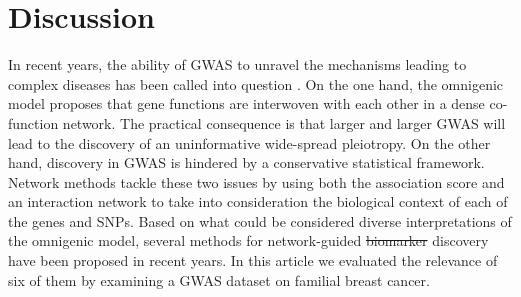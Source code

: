 \documentclass[10pt,letterpaper]{article}
\providecommand{\DIFaddtex}[1]{{\protect\color{blue}\uwave{#1}}} %
\providecommand{\DIFdeltex}[1]{{\protect\color{red}\sout{#1}}}                      %
\providecommand{\DIFaddbegin}{} %
\providecommand{\DIFaddend}{} %
\providecommand{\DIFdelbegin}{} %
\providecommand{\DIFdelend}{} %
\providecommand{\DIFadd}[1]{\texorpdfstring{\DIFaddtex{#1}}{#1}} %
\providecommand{\DIFdel}[1]{\texorpdfstring{\DIFdeltex{#1}}{}} %
\newcommand{\DIFscaledelfig}{0.5}
\newlength{\DIFdelgraphicswidth} %
\newlength{\DIFdelgraphicsheight} %
\newcommand{\DIFaddincludegraphics}[2][]{{\color{blue}\fbox{\DIFOincludegraphics[#1]{#2}}}} %
\newcommand{\DIFdelincludegraphics}[2][]{%
\sbox{\DIFdelgraphicsbox}{\DIFOincludegraphics[#1]{#2}}%
\settoboxwidth{\DIFdelgraphicswidth}{\DIFdelgraphicsbox} %
\settoboxtotalheight{\DIFdelgraphicsheight}{\DIFdelgraphicsbox} %
\scalebox{\DIFscaledelfig}{%
\parbox[b]{\DIFdelgraphicswidth}{\usebox{\DIFdelgraphicsbox}\\[-\baselineskip] \rule{\DIFdelgraphicswidth}{0em}}\llap{\resizebox{\DIFdelgraphicswidth}{\DIFdelgraphicsheight}{%
\setlength{\unitlength}{\DIFdelgraphicswidth}%
\begin{picture}(1,1)%
\thicklines\linethickness{2pt} %
{\color[rgb]{1,0,0}\put(0,0){\framebox(1,1){}}}%
{\color[rgb]{1,0,0}\put(0,0){\line( 1,1){1}}}%
{\color[rgb]{1,0,0}\put(0,1){\line(1,-1){1}}}%
\end{picture}%
}\hspace*{3pt}}} %
} %
\DeclareRobustCommand{\DIFaddbegin}{\DIFOaddbegin \let\includegraphics\DIFaddincludegraphics} %
\DeclareRobustCommand{\DIFaddend}{\DIFOaddend \let\includegraphics\DIFOincludegraphics} %
\DeclareRobustCommand{\DIFdelbegin}{\DIFOdelbegin \let\includegraphics\DIFdelincludegraphics} %
\DeclareRobustCommand{\DIFdelend}{\DIFOaddend \let\includegraphics\DIFOincludegraphics} %
\begin{document}
\section{Discussion}

In recent years, the ability of GWAS to unravel the mechanisms leading to complex diseases has been called into question \cite{boyle_expanded_2017}. On the one hand, the omnigenic model proposes that gene functions are interwoven with each other in a dense co-function network. The practical consequence is that larger and larger GWAS will lead to the discovery of an uninformative wide-spread pleiotropy. On the other hand, discovery in GWAS is hindered by a conservative statistical framework. Network methods tackle these two issues by using both the association score and an interaction network to take into consideration the biological context of each of the genes and SNPs. Based on what could be considered diverse interpretations of the omnigenic model, several methods for network-guided \DIFdelbegin \DIFdel{biomarker }\DIFdelend discovery have been proposed in recent years. In this article we evaluated the relevance of six of them by examining \DIFaddbegin \DIFadd{GENESIS, }\DIFaddend a GWAS dataset on familial breast cancer.
\end{document}
